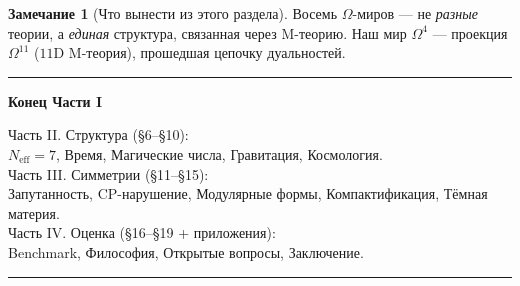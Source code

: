 \documentclass[11pt,a4paper]{article}
\newcommand{\Om}{\Omega^4}
\newcommand{\Ome}{\Omega^{11}}
\newcommand{\Neff}{N_{\text{eff}}}
\theoremstyle{definition}
\newtheorem{remark}[theorem]{Замечание}
\begin{document}
\begin{remark}[Что вынести из этого раздела]
\label{rem:mtheory-takeaway}
Восемь $\Omega$-миров — не \emph{разные} теории, а 
\emph{единая} структура, связанная через M-теорию. Наш мир 
$\Om$ — проекция $\Ome$ ($11$D M-теория), прошедшая цепочку 
дуальностей.
\end{remark}


\vfill

\begin{center}
\rule{0.6\textwidth}{0.4pt}

\vspace{0.5cm}

{\large\bfseries Конец Части I}

\vspace{0.3cm}

{\small
Часть II. Структура (§6–§10): \\
$\Neff = 7$, Время, Магические числа, Гравитация, Космология. \\
Часть III. Симметрии (§11–§15): \\
Запутанность, CP-нарушение, Модулярные формы, Компактификация, 
Тёмная материя. \\
Часть IV. Оценка (§16–§19 + приложения): \\
Benchmark, Философия, Открытые вопросы, Заключение.
}

\vspace{0.5cm}

\rule{0.6\textwidth}{0.4pt}
\end{center}




\vspace{1cm}
\end{document}
